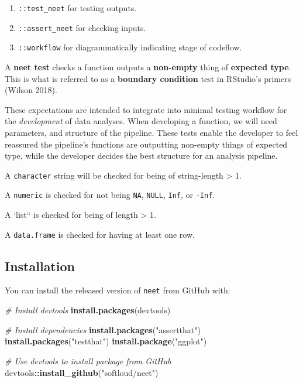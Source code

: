 \documentclass[
]{article}
\newenvironment{Shaded}{\begin{snugshade}}{\end{snugshade}}
\newcommand{\CommentTok}[1]{\textcolor[rgb]{0.56,0.35,0.01}{\textit{#1}}}
\newcommand{\KeywordTok}[1]{\textcolor[rgb]{0.13,0.29,0.53}{\textbf{#1}}}
\newcommand{\NormalTok}[1]{#1}
\newcommand{\OperatorTok}[1]{\textcolor[rgb]{0.81,0.36,0.00}{\textbf{#1}}}
\newcommand{\StringTok}[1]{\textcolor[rgb]{0.31,0.60,0.02}{#1}}
\providecommand{\tightlist}{%
  \setlength{\itemsep}{0pt}\setlength{\parskip}{0pt}}
\begin{document}
\begin{enumerate}
\def\labelenumi{\arabic{enumi}.}
\tightlist
\item
  \texttt{::test\_neet} for testing outputs.
\item
  \texttt{::assert\_neet} for checking inputs.
\item
  \texttt{::workflow} for diagrammatically indicating stage of codeflow.
\end{enumerate}

A \textbf{neet test} checks a function outputs a \textbf{non-empty} thing of \textbf{expected type}. This is what is referred to as a \textbf{boundary condition} test in RStudio's primers (Wilson 2018).

These expectations are intended to integrate into minimal testing workflow
for the \emph{development} of data analyses. When developing a function, we will need parameters, and structure of the pipeline. These tests
enable the developer to feel reassured the pipeline's functions are
outputting non-empty things of expected type, while the developer decides the best structure for an analysis pipeline.

A \texttt{character} string will be checked for being of string-length \textgreater{} 1.

A \texttt{numeric} is checked for not being \texttt{NA}, \texttt{NULL}, \texttt{Inf}, or \texttt{-Inf}.

A `list`` is checked for being of length \textgreater{} 1.

A \texttt{data.frame} is checked for having at least one row.

\hypertarget{installation}{%
\subsection{Installation}\label{installation}}

You can install the released version of \texttt{neet} from GitHub with:

\begin{Shaded}
\begin{Highlighting}[]
\CommentTok{\# Install devtools}
\KeywordTok{install.packages}\NormalTok{(devtools) }

\CommentTok{\# Install dependencies}
\KeywordTok{install.packages}\NormalTok{(}\StringTok{"assertthat"}\NormalTok{)}
\KeywordTok{install.packages}\NormalTok{(}\StringTok{"testthat"}\NormalTok{)}
\KeywordTok{install.package}\NormalTok{(}\StringTok{"ggplot"}\NormalTok{)}

\CommentTok{\# Use devtools to install package from GitHub}
\NormalTok{devtools}\OperatorTok{::}\KeywordTok{install\_github}\NormalTok{(}\StringTok{"softloud/neet"}\NormalTok{)}
\end{Highlighting}
\end{Shaded}
\end{document}
